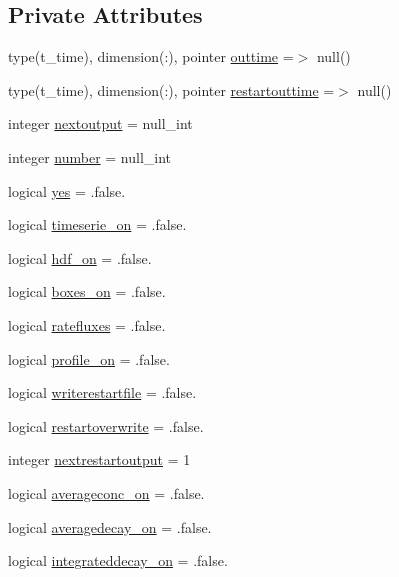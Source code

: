 \subsection*{Private Attributes}
\begin{DoxyCompactItemize}
\item 
type(t\+\_\+time), dimension(\+:), pointer \mbox{\hyperlink{structmoduleporousmediaproperties_1_1t__output_a1a581b879179546837f202e330351765}{outtime}} =$>$ null()
\item 
type(t\+\_\+time), dimension(\+:), pointer \mbox{\hyperlink{structmoduleporousmediaproperties_1_1t__output_a9ab5e39c02f4f78a24eb5e94a0024dec}{restartouttime}} =$>$ null()
\item 
integer \mbox{\hyperlink{structmoduleporousmediaproperties_1_1t__output_a02a6e7e86a45d77e3b10136f1e47a26f}{nextoutput}} = null\+\_\+int
\item 
integer \mbox{\hyperlink{structmoduleporousmediaproperties_1_1t__output_a18cd09564d8da8c5cd6c38cf32594d68}{number}} = null\+\_\+int
\item 
logical \mbox{\hyperlink{structmoduleporousmediaproperties_1_1t__output_a82afbf45cd736a34347d080a45bc1acd}{yes}} = .false.
\item 
logical \mbox{\hyperlink{structmoduleporousmediaproperties_1_1t__output_a3c080b856eaee6ff30cc4eebed11d283}{timeserie\+\_\+on}} = .false.
\item 
logical \mbox{\hyperlink{structmoduleporousmediaproperties_1_1t__output_acfad6159e4484cebb6f63fd5bb5f1960}{hdf\+\_\+on}} = .false.
\item 
logical \mbox{\hyperlink{structmoduleporousmediaproperties_1_1t__output_a469f03a3397c6201103e720cf5c2e111}{boxes\+\_\+on}} = .false.
\item 
logical \mbox{\hyperlink{structmoduleporousmediaproperties_1_1t__output_ac82527a7cfc6b8bf131c71c70903c229}{ratefluxes}} = .false.
\item 
logical \mbox{\hyperlink{structmoduleporousmediaproperties_1_1t__output_a7e1f3fc7ae8d8745b320b769bbac1976}{profile\+\_\+on}} = .false.
\item 
logical \mbox{\hyperlink{structmoduleporousmediaproperties_1_1t__output_acbce1a3869694167ad0d92e6b9f1762c}{writerestartfile}} = .false.
\item 
logical \mbox{\hyperlink{structmoduleporousmediaproperties_1_1t__output_a7fa0bf64ecacd7a27059bb9552a7ee11}{restartoverwrite}} = .false.
\item 
integer \mbox{\hyperlink{structmoduleporousmediaproperties_1_1t__output_a97c3a21833534615f6430c51636357ab}{nextrestartoutput}} = 1
\item 
logical \mbox{\hyperlink{structmoduleporousmediaproperties_1_1t__output_a5b543fcc28ef077b31f84fcdb7bbdabe}{averageconc\+\_\+on}} = .false.
\item 
logical \mbox{\hyperlink{structmoduleporousmediaproperties_1_1t__output_afc0c02000391f1c017493361ef15e9bc}{averagedecay\+\_\+on}} = .false.
\item 
logical \mbox{\hyperlink{structmoduleporousmediaproperties_1_1t__output_a30382e62897bf427f23ef0f6975e9b0a}{integrateddecay\+\_\+on}} = .false.
\end{DoxyCompactItemize}


